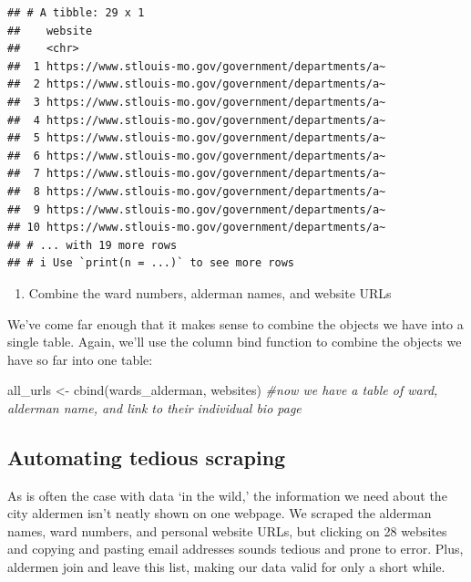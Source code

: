 \documentclass[
  krantz2]{krantz}
\makeatletter
\newenvironment{Shaded}{\begin{snugshade}}{\end{snugshade}}
\newcommand{\CommentTok}[1]{\textcolor[rgb]{0.37,0.37,0.37}{\textit{#1}}}
\newcommand{\FunctionTok}[1]{\textcolor[rgb]{0,0,0}{#1}}
\newcommand{\NormalTok}[1]{#1}
\newcommand{\OtherTok}[1]{\textcolor[rgb]{0.37,0.37,0.37}{#1}}
\providecommand{\tightlist}{%
  \setlength{\itemsep}{0pt}\setlength{\parskip}{0pt}}
\newenvironment{kframe}{%
\medskip{}
\setlength{\fboxsep}{.8em}
 \def\at@end@of@kframe{}%
 \ifinner\ifhmode%
  \def\at@end@of@kframe{\end{minipage}}%
  \begin{minipage}{\columnwidth}%
 \fi\fi%
 \def\FrameCommand##1{\hskip\@totalleftmargin \hskip-\fboxsep
 \colorbox{shadecolor}{##1}\hskip-\fboxsep
     \hskip-\linewidth \hskip-\@totalleftmargin \hskip\columnwidth}%
 \MakeFramed {\advance\hsize-\width
   \@totalleftmargin\z@ \linewidth\hsize
   \@setminipage}}%
 {\par\unskip\endMakeFramed%
 \at@end@of@kframe}
\renewenvironment{Shaded}{\begin{kframe}}{\end{kframe}}
\makeatother
\begin{document}
\begin{verbatim}
## # A tibble: 29 x 1
##    website
##    <chr>
##  1 https://www.stlouis-mo.gov/government/departments/a~
##  2 https://www.stlouis-mo.gov/government/departments/a~
##  3 https://www.stlouis-mo.gov/government/departments/a~
##  4 https://www.stlouis-mo.gov/government/departments/a~
##  5 https://www.stlouis-mo.gov/government/departments/a~
##  6 https://www.stlouis-mo.gov/government/departments/a~
##  7 https://www.stlouis-mo.gov/government/departments/a~
##  8 https://www.stlouis-mo.gov/government/departments/a~
##  9 https://www.stlouis-mo.gov/government/departments/a~
## 10 https://www.stlouis-mo.gov/government/departments/a~
## # ... with 19 more rows
## # i Use `print(n = ...)` to see more rows
\end{verbatim}

\begin{enumerate}
\def\labelenumi{\arabic{enumi}.}
\setcounter{enumi}{2}
\tightlist
\item
  Combine the ward numbers, alderman names, and website URLs
\end{enumerate}

We've come far enough that it makes sense to combine the objects we have into a single table. Again, we'll use the column bind function to combine the objects we have so far into one table:

\begin{Shaded}
\begin{Highlighting}[]
\NormalTok{all\_urls }\OtherTok{\textless{}{-}} \FunctionTok{cbind}\NormalTok{(wards\_alderman, websites) }
\CommentTok{\#now we have a table of ward, alderman name, and link to their individual bio page}
\end{Highlighting}
\end{Shaded}

\hypertarget{automating-tedious-scraping}{%
\subsection{Automating tedious scraping}\label{automating-tedious-scraping}}

As is often the case with data `in the wild,' the information we need about the city aldermen isn't neatly shown on one webpage. We scraped the alderman names, ward numbers, and personal website URLs, but clicking on 28 websites and copying and pasting email addresses sounds tedious and prone to error. Plus, aldermen join and leave this list, making our data valid for only a short while.
\end{document}
